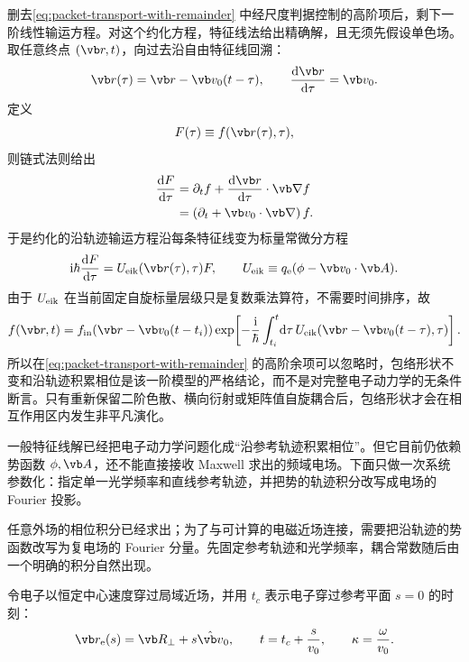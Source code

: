 删去\cref{eq:packet-transport-with-remainder} 中经尺度判据控制的高阶项后，剩下一阶线性输运方程。对这个约化方程，特征线法给出精确解，且无须先假设单色场。取任意终点 $(\vb r,t)$，向过去沿自由特征线回溯：
\begin{equation}
 \vb r(\tau)=\vb r-\vb v_0(t-\tau),
 \qquad
 \frac{\dd\vb r}{\dd\tau}=\vb v_0.
 \label{eq:characteristic-curve}
\end{equation}
定义
\begin{equation}
 F(\tau)\equiv f(\vb r(\tau),\tau),
\end{equation}
则链式法则给出
\begin{align}
 \frac{\dd F}{\dd\tau}
 &=\partial_t f
 +\frac{\dd\vb r}{\dd\tau}\cdot\vb\nabla f\\
 &=\left(\partial_t+\vb v_0\cdot\vb\nabla\right)f.
\end{align}
于是约化的沿轨迹输运方程沿每条特征线变为标量常微分方程
\begin{equation}
 \ii\hbar\frac{\dd F}{\dd\tau}
 =U_{\rm eik}(\vb r(\tau),\tau)F,
 \qquad
 U_{\rm eik}\equiv q_{\rm e}(\phi-\vb v_0\cdot\vb A).
 \label{eq:characteristic-ode}
\end{equation}
由于 $U_{\rm eik}$ 在当前固定自旋标量层级只是复数乘法算符，不需要时间排序，故
\begin{equation}
 {
 f(\vb r,t)=
 f_{\rm in}\!\left(\vb r-\vb v_0(t-t_i)\right)
 \exp\!\left[
 -\frac{\ii}{\hbar}
 \int_{t_i}^{t}\!\dd\tau\,
 U_{\rm eik}\!\left(\vb r-\vb v_0(t-\tau),\tau\right)
 \right].}
 \label{eq:characteristic-exact-solution}
\end{equation}
所以在\cref{eq:packet-transport-with-remainder} 的高阶余项可以忽略时，包络形状不变和沿轨迹积累相位是该一阶模型的严格结论，而不是对完整电子动力学的无条件断言。只有重新保留二阶色散、横向衍射或矩阵值自旋耦合后，包络形状才会在相互作用区内发生非平凡演化。

一般特征线解已经把电子动力学问题化成“沿参考轨迹积累相位”。但它目前仍依赖势函数 $\phi,\vb A$，还不能直接接收 Maxwell 求出的频域电场。下面只做一次系统参数化：指定单一光学频率和直线参考轨迹，并把势的轨迹积分改写成电场的 Fourier 投影。


任意外场的相位积分已经求出；为了与可计算的电磁近场连接，需要把沿轨迹的势函数改写为复电场的 Fourier 分量。先固定参考轨迹和光学频率，耦合常数随后由一个明确的积分自然出现。


令电子以恒定中心速度穿过局域近场，并用 $t_c$ 表示电子穿过参考平面 $s=0$ 的时刻：
\begin{equation}
\vb r_{\rm e}(s)=\vb R_\perp+s\hat{\vb v}_0,
\qquad
t=t_c+\frac{s}{v_0},
\qquad
\kappa=\frac{\omega}{v_0}.
\label{eq:trajectory-tc}
\end{equation}

